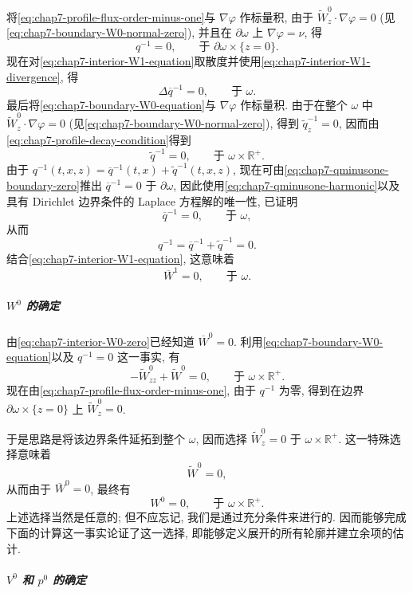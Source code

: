 \begin{sloppypar}
将\eqref{eq:chap7-profile-flux-order-minus-one}与 $\nabla\varphi$ 作标量积, 由于 $\widetilde W^0_z\cdot\nabla\varphi=0$ (见\eqref{eq:chap7-boundary-W0-normal-zero}), 并且在 $\partial\omega$ 上 $\nabla\varphi=\nu$, 得
\begin{equation}
 q^{-1}=0,\qquad\text{于 }\partial\omega\times\{z=0\}.
\label{eq:chap7-qminusone-boundary-zero}
\end{equation}
现在对\eqref{eq:chap7-interior-W1-equation}取散度并使用\eqref{eq:chap7-interior-W1-divergence}, 得
\begin{equation}
 \Delta\overline q^{-1}=0,\qquad\text{于 }\omega.
\label{eq:chap7-qminusone-harmonic}
\end{equation}
最后将\eqref{eq:chap7-boundary-W0-equation}与 $\nabla\varphi$ 作标量积. 由于在整个 $\omega$ 中 $\widetilde W^0_z\cdot\nabla\varphi=0$ (见\eqref{eq:chap7-boundary-W0-normal-zero}), 得到 $\widetilde q^{-1}_z=0$, 因而由\eqref{eq:chap7-profile-decay-condition}得到
\[
 \widetilde q^{-1}=0,\qquad\text{于 }\omega\times\mathbb R^+.
\]
由于 $q^{-1}(t,x,z)=\overline q^{-1}(t,x)+\widetilde q^{-1}(t,x,z)$, 现在可由\eqref{eq:chap7-qminusone-boundary-zero}推出 $\overline q^{-1}=0$ 于 $\partial\omega$, 因此使用\eqref{eq:chap7-qminusone-harmonic}以及具有 Dirichlet 边界条件的 Laplace 方程解的唯一性, 已证明
\[
 \overline q^{-1}=0,\qquad\text{于 }\omega,
\]
从而
\[
 q^{-1}=\overline q^{-1}+\widetilde q^{-1}=0.
\]
结合\eqref{eq:chap7-interior-W1-equation}, 这意味着
\[
 \overline W^1=0,\qquad\text{于 }\omega.
\]

\subparagraph{$W^0$ 的确定}

由\eqref{eq:chap7-interior-W0-zero}已经知道 $\overline W^0=0$. 利用\eqref{eq:chap7-boundary-W0-equation}以及 $q^{-1}=0$ 这一事实, 有
\[
 -\widetilde W^0_{zz}+\widetilde W^0=0,
 \qquad\text{于 }\omega\times\mathbb R^+.
\]
现在由\eqref{eq:chap7-profile-flux-order-minus-one}, 由于 $q^{-1}$ 为零, 得到在边界 $\partial\omega\times\{z=0\}$ 上 $\widetilde W^0_z=0$.

于是思路是将该边界条件延拓到整个 $\omega$, 因而选择 $\widetilde W^0_z=0$ 于 $\omega\times\mathbb R^+$. 这一特殊选择意味着
\[
 \widetilde W^0=0,
\]
从而由于 $\overline W^0=0$, 最终有
\begin{equation}
 W^0=0,\qquad\text{于 }\omega\times\mathbb R^+.
\label{eq:chap7-W0-zero}
\end{equation}
上述选择当然是任意的; 但不应忘记, 我们是通过充分条件来进行的. 因而能够完成下面的计算这一事实论证了这一选择, 即能够定义展开的所有轮廓并建立余项的估计.

\subparagraph{$V^0$ 和 $p^0$ 的确定}


\end{sloppypar}
